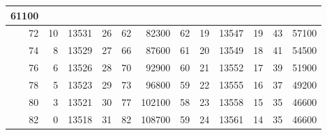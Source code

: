 \begin{table}[H]
{\begin{tabular}{|rrrrrr||rrrrrr|}
  \multicolumn{1}{r|}{61100} \\ \hline
\multicolumn{1}{|r|}{72} &
  \multicolumn{1}{r|}{10} &
  \multicolumn{1}{r|}{13531} &
  \multicolumn{1}{r|}{26} &
  \multicolumn{1}{r|}{62} &
  82300 &
  \multicolumn{1}{r|}{62} &
  \multicolumn{1}{r|}{19} &
  \multicolumn{1}{r|}{13547} &
  \multicolumn{1}{r|}{19} &
  \multicolumn{1}{r|}{43} &
  \multicolumn{1}{r|}{57100} \\ \hline
\multicolumn{1}{|r|}{74} &
  \multicolumn{1}{r|}{8} &
  \multicolumn{1}{r|}{13529} &
  \multicolumn{1}{r|}{27} &
  \multicolumn{1}{r|}{66} &
  87600 &
  \multicolumn{1}{r|}{61} &
  \multicolumn{1}{r|}{20} &
  \multicolumn{1}{r|}{13549} &
  \multicolumn{1}{r|}{18} &
  \multicolumn{1}{r|}{41} &
  \multicolumn{1}{r|}{54500} \\ \hline
\multicolumn{1}{|r|}{76} &
  \multicolumn{1}{r|}{6} &
  \multicolumn{1}{r|}{13526} &
  \multicolumn{1}{r|}{28} &
  \multicolumn{1}{r|}{70} &
  92900 &
  \multicolumn{1}{r|}{60} &
  \multicolumn{1}{r|}{21} &
  \multicolumn{1}{r|}{13552} &
  \multicolumn{1}{r|}{17} &
  \multicolumn{1}{r|}{39} &
  \multicolumn{1}{r|}{51900} \\ \hline
\multicolumn{1}{|r|}{78} &
  \multicolumn{1}{r|}{5} &
  \multicolumn{1}{r|}{13523} &
  \multicolumn{1}{r|}{29} &
  \multicolumn{1}{r|}{73} &
  96800 &
  \multicolumn{1}{r|}{59} &
  \multicolumn{1}{r|}{22} &
  \multicolumn{1}{r|}{13555} &
  \multicolumn{1}{r|}{16} &
  \multicolumn{1}{r|}{37} &
  \multicolumn{1}{r|}{49200} \\ \hline
\multicolumn{1}{|r|}{80} &
  \multicolumn{1}{r|}{3} &
  \multicolumn{1}{r|}{13521} &
  \multicolumn{1}{r|}{30} &
  \multicolumn{1}{r|}{77} &
  102100 &
  \multicolumn{1}{r|}{58} &
  \multicolumn{1}{r|}{23} &
  \multicolumn{1}{r|}{13558} &
  \multicolumn{1}{r|}{15} &
  \multicolumn{1}{r|}{35} &
  \multicolumn{1}{r|}{46600} \\ \hline
\multicolumn{1}{|r|}{82} &
  \multicolumn{1}{r|}{0} &
  \multicolumn{1}{r|}{13518} &
  \multicolumn{1}{r|}{31} &
  \multicolumn{1}{r|}{82} &
  108700 &
  \multicolumn{1}{r|}{59} &
  \multicolumn{1}{r|}{24} &
  \multicolumn{1}{r|}{13561} &
  \multicolumn{1}{r|}{14} &
  \multicolumn{1}{r|}{35} &
  \multicolumn{1}{r|}{46600} \\ \hline
\end{tabular}
}
\end{table}
	
	

